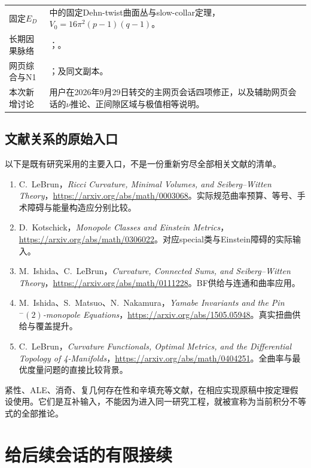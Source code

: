\documentclass[UTF8,fontset=fandol,zihao=-4,a4paper]{ctexart}
\theoremstyle{remark}
\begin{document}
\begin{longtable}{L{29mm}L{118mm}}
固定$E_D$ & 中的固定Dehn-twist曲面丛与slow-collar定理，$V_0=16\pi^2(p-1)(q-1)$。 \\
长期因果脉络 & ；。 \\
网页综合与N1 & ；及同文副本。 \\
本次新增讨论 & 用户在2026年9月29日转交的主网页会话四项修正，以及辅助网页会话的$\nu$推论、正间隙区域与极值相等说明。 \\
\bottomrule
\end{longtable}

\subsection*{文献关系的原始入口}

以下是既有研究采用的主要入口，不是一份重新穷尽全部相关文献的清单。
\begin{enumerate}
\item C.~LeBrun，\emph{Ricci Curvature, Minimal Volumes, and Seiberg--Witten Theory}，\url{https://arxiv.org/abs/math/0003068}。实际规范曲率预算、等号、手术障碍与能量构造应分别比较。
\item D.~Kotschick，\emph{Monopole Classes and Einstein Metrics}，\url{https://arxiv.org/abs/math/0306022}。对应special类与Einstein障碍的实际输入。
\item M.~Ishida、C.~LeBrun，\emph{Curvature, Connected Sums, and Seiberg--Witten Theory}，\url{https://arxiv.org/abs/math/0111228}。BF供给与连通和曲率应用。
\item M.~Ishida、S.~Matsuo、N.~Nakamura，\emph{Yamabe Invariants and the Pin$^-(2)$-monopole Equations}，\url{https://arxiv.org/abs/1505.05948}。真实扭曲供给与覆盖提升。
\item C.~LeBrun，\emph{Curvature Functionals, Optimal Metrics, and the Differential Topology of 4-Manifolds}，\url{https://arxiv.org/abs/math/0404251}。全曲率与最优度量问题的直接比较背景。
\end{enumerate}

紧性、ALE、消奇、复几何存在性和辛填充等文献，在相应实现原稿中按定理假设使用。它们是互补输入，不能因为进入同一研究工程，就被宣称为当前积分不等式的全部推论。

\section{给后续会话的有限接续}
\end{document}
